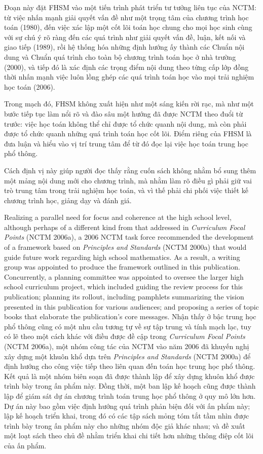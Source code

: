 \documentclass[
  10pt,
  a4paper,
  landscape,
  twoside,
  openany
]{scrbook}
\newcommand{\EN}[1]{#1}
\newcommand{\VI}[1]{#1}
\newcommand{\NOTE}[1]{#1}
\begin{document}
{
\NOTE{Đoạn này đặt FHSM vào một tiến trình phát triển tư tưởng liên tục của NCTM: từ việc nhấn mạnh giải quyết vấn đề như một trọng tâm của chương trình học toán (1980), đến việc xác lập một cốt lõi toán học chung cho mọi học sinh cùng với sự chú ý rõ ràng đến các quá trình như giải quyết vấn đề, luận, kết nối và giao tiếp (1989), rồi hệ thống hóa những định hướng ấy thành các Chuẩn nội dung và Chuẩn quá trình cho toàn bộ chương trình toán học ở nhà trường (2000), và tiếp đó là xác định các trọng điểm nội dung theo từng cấp lớp đồng thời nhấn mạnh việc luôn lồng ghép các quá trình toán học vào mọi trải nghiệm học toán (2006).

Trong mạch đó, FHSM không xuất hiện như một sáng kiến rời rạc, mà như một bước tiếp tục làm nổi rõ và đào sâu một hướng đã được NCTM theo đuổi từ trước: việc học toán không thể chỉ được tổ chức quanh nội dung, mà còn phải được tổ chức quanh những quá trình toán học cốt lõi. Điểm riêng của FHSM là đưa luận và hiểu vào vị trí trung tâm để từ đó đọc lại việc học toán trung học phổ thông.

Cách định vị này giúp người đọc thấy rằng cuốn sách không nhằm bổ sung thêm một mảng nội dung mới cho chương trình, mà nhằm làm rõ điều gì phải giữ vai trò trung tâm trong trải nghiệm học toán, và vì thế phải chi phối việc thiết kế chương trình học, giảng dạy và đánh giá.}
}

\TriPara
{
\EN{Realizing a parallel need for focus and coherence at the high school level, although perhaps of a different kind from that addressed in \emph{Curriculum Focal Points} (NCTM 2006a), a 2006 NCTM task force recommended the development of a framework based on \emph{Principles and Standards} (NCTM 2000a) that would guide future work regarding high school mathematics. As a result, a writing group was appointed to produce the framework outlined in this publication. Concurrently, a planning committee was appointed to oversee the larger high school curriculum project, which included guiding the review process for this publication; planning its rollout, including pamphlets summarizing the vision presented in this publication for various audiences; and proposing a series of topic books that elaborate the publication's core messages.}
}
{
\VI{Nhận thấy ở bậc trung học phổ thông cũng có một nhu cầu tương tự về sự tập trung và tính mạch lạc, tuy có lẽ theo một cách khác với điều được đề cập trong \emph{Curriculum Focal Points} (NCTM 2006a), một nhóm công tác của NCTM vào năm 2006 đã khuyến nghị xây dựng một khuôn khổ dựa trên \emph{Principles and Standards} (NCTM 2000a) để định hướng cho công việc tiếp theo liên quan đến toán học trung học phổ thông. Kết quả là một nhóm biên soạn đã được thành lập để xây dựng khuôn khổ được trình bày trong ấn phẩm này. Đồng thời, một ban lập kế hoạch cũng được thành lập để giám sát dự án chương trình toán trung học phổ thông ở quy mô lớn hơn. Dự án này bao gồm việc định hướng quá trình phản biện đối với ấn phẩm này; lập kế hoạch triển khai, trong đó có các tập sách mỏng tóm tắt tầm nhìn được trình bày trong ấn phẩm này cho những nhóm độc giả khác nhau; và đề xuất một loạt sách theo chủ đề nhằm triển khai chi tiết hơn những thông điệp cốt lõi của ấn phẩm.}
}
{
\NOTE{}
}
\end{document}
